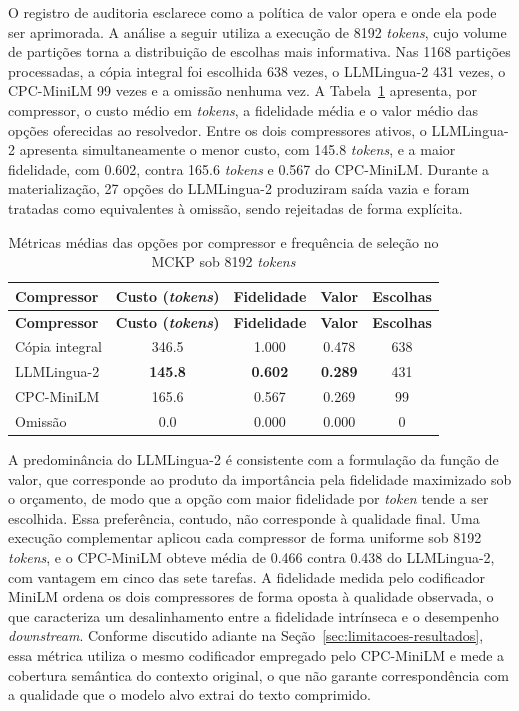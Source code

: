 O registro de auditoria esclarece como a política de valor opera e onde ela pode ser aprimorada. A análise a seguir utiliza a execução de 8192 \textit{tokens}, cujo volume de partições torna a distribuição de escolhas mais informativa. Nas 1168 partições processadas, a cópia integral foi escolhida 638 vezes, o LLMLingua-2 431 vezes, o CPC-MiniLM 99 vezes e a omissão nenhuma vez. A Tabela~\ref{tab:mckp-solver-opcoes} apresenta, por compressor, o custo médio em \textit{tokens}, a fidelidade média e o valor médio das opções oferecidas ao resolvedor. Entre os dois compressores ativos, o LLMLingua-2 apresenta simultaneamente o menor custo, com 145.8 \textit{tokens}, e a maior fidelidade, com 0.602, contra 165.6 \textit{tokens} e 0.567 do CPC-MiniLM. Durante a materialização, 27 opções do LLMLingua-2 produziram saída vazia e foram tratadas como equivalentes à omissão, sendo rejeitadas de forma explícita.

{
\footnotesize
\setlength{\tabcolsep}{6pt}
\begin{longtable}{lcccc}
\caption{Métricas médias das opções por compressor e frequência de seleção no MCKP sob 8192 \textit{tokens}}
\label{tab:mckp-solver-opcoes} \\
\toprule
\textbf{Compressor} & \textbf{Custo (\textit{tokens})} & \textbf{Fidelidade} & \textbf{Valor} & \textbf{Escolhas} \\
\midrule
\endfirsthead
\toprule
\textbf{Compressor} & \textbf{Custo (\textit{tokens})} & \textbf{Fidelidade} & \textbf{Valor} & \textbf{Escolhas} \\
\midrule
\endhead
\bottomrule
\endfoot
\bottomrule
\endlastfoot
Cópia integral & 346.5 & 1.000 & 0.478 & 638 \\
LLMLingua-2    & \textbf{145.8} & \textbf{0.602} & \textbf{0.289} & 431 \\
CPC-MiniLM     & 165.6 & 0.567 & 0.269 & 99 \\
Omissão        & 0.0 & 0.000 & 0.000 & 0 \\
\end{longtable}
}

A predominância do LLMLingua-2 é consistente com a formulação da função de valor, que corresponde ao produto da importância pela fidelidade maximizado sob o orçamento, de modo que a opção com maior fidelidade por \textit{token} tende a ser escolhida. Essa preferência, contudo, não corresponde à qualidade final. Uma execução complementar aplicou cada compressor de forma uniforme sob 8192 \textit{tokens}, e o CPC-MiniLM obteve média de 0.466 contra 0.438 do LLMLingua-2, com vantagem em cinco das sete tarefas. A fidelidade medida pelo codificador MiniLM ordena os dois compressores de forma oposta à qualidade observada, o que caracteriza um desalinhamento entre a fidelidade intrínseca e o desempenho \textit{downstream}. Conforme discutido adiante na Seção~\ref{sec:limitacoes-resultados}, essa métrica utiliza o mesmo codificador empregado pelo CPC-MiniLM e mede a cobertura semântica do contexto original, o que não garante correspondência com a qualidade que o modelo alvo extrai do texto comprimido.

